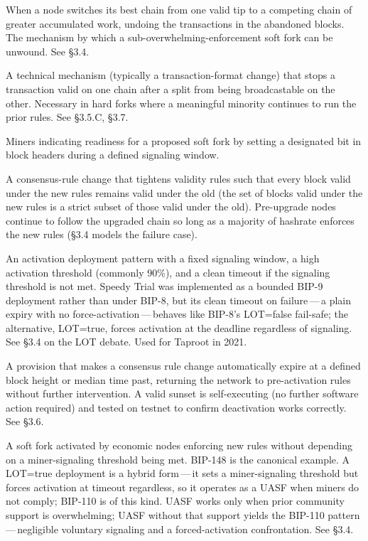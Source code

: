 \documentclass[11pt, twoside, openright]{book}
\newcommand{\sect}[1]{\S#1}
\begin{document}
\begin{description}[leftmargin=0pt, labelindent=0pt, style=nextline, itemsep=8pt]
  \item[Reorganization (reorg).] When a node switches its best chain from one valid tip to a competing chain of greater accumulated work, undoing the transactions in the abandoned blocks. The mechanism by which a sub-overwhelming-enforcement soft fork can be unwound. See \sect{3.4}.

  \item[Replay protection.] A technical mechanism (typically a transaction-format change) that stops a transaction valid on one chain after a split from being broadcastable on the other. Necessary in hard forks where a meaningful minority continues to run the prior rules. See \sect{3.5}.C, \sect{3.7}.

  \item[Signaling.] Miners indicating readiness for a proposed soft fork by setting a designated bit in block headers during a defined signaling window.

  \item[Soft fork.] A consensus-rule change that tightens validity rules such that every block valid under the new rules remains valid under the old (the set of blocks valid under the new rules is a strict subset of those valid under the old). Pre-upgrade nodes continue to follow the upgraded chain so long as a majority of hashrate enforces the new rules (\sect{3.4} models the failure case).

  \item[Speedy Trial.] An activation deployment pattern with a fixed signaling window, a high activation threshold (commonly 90\%), and a clean timeout if the signaling threshold is not met. Speedy Trial was implemented as a bounded BIP-9 deployment rather than under BIP-8, but its clean timeout on failure\,---\,a plain expiry with no force-activation\,---\,behaves like BIP-8's LOT=false fail-safe; the alternative, LOT=true, forces activation at the deadline regardless of signaling. See \sect{3.4} on the LOT debate. Used for Taproot in 2021.

  \item[Sunset clause.] A provision that makes a consensus rule change automatically expire at a defined block height or median time past, returning the network to pre-activation rules without further intervention. A valid sunset is self-executing (no further software action required) and tested on testnet to confirm deactivation works correctly. See \sect{3.6}.

  \item[UASF (User-Activated Soft Fork).] A soft fork activated by economic nodes enforcing new rules without depending on a miner-signaling threshold being met. BIP-148 is the canonical example. A LOT=true deployment is a hybrid form\,---\,it sets a miner-signaling threshold but forces activation at timeout regardless, so it operates as a UASF when miners do not comply; BIP-110 is of this kind. UASF works only when prior community support is overwhelming; UASF without that support yields the BIP-110 pattern\,---\,negligible voluntary signaling and a forced-activation confrontation. See \sect{3.4}.


\end{description}
\end{document}

